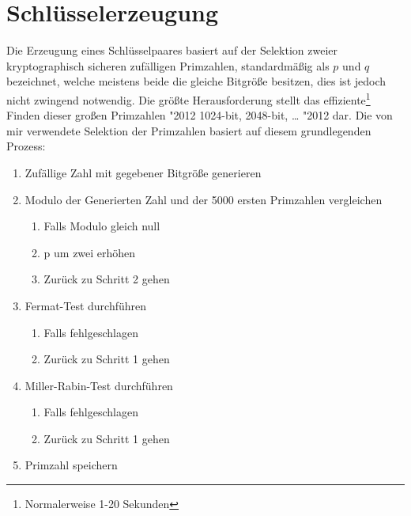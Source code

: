 \section{Schlüsselerzeugung}

Die Erzeugung eines Schlüsselpaares basiert auf der Selektion zweier kryptographisch sicheren zufälligen Primzahlen, standardmäßig als $p$ und $q$ bezeichnet, welche meistens beide die gleiche Bitgröße besitzen, dies ist jedoch nicht zwingend notwendig. Die größte Herausforderung stellt das effiziente\footnote{Normalerweise 1-20 Sekunden} Finden dieser großen Primzahlen \char"2012{} 1024-bit, 2048-bit, \ldots{} \char"2012{} dar. Die von mir verwendete Selektion der Primzahlen basiert auf diesem grundlegenden Prozess:

\begin{enumerate}
  \item Zufällige Zahl mit gegebener Bitgröße generieren
  \item Modulo der Generierten Zahl und der 5000 ersten Primzahlen vergleichen
    \begin{enumerate}
      \item Falls Modulo gleich null
      \item p um zwei erhöhen
      \item Zurück zu Schritt 2 gehen
    \end{enumerate}
  \item Fermat-Test durchführen
    \begin{enumerate}
      \item Falls fehlgeschlagen
      \item Zurück zu Schritt 1 gehen
    \end{enumerate}
  \item Miller-Rabin-Test durchführen
    \begin{enumerate}
      \item Falls fehlgeschlagen
      \item Zurück zu Schritt 1 gehen
    \end{enumerate}
  \item Primzahl speichern
\end{enumerate}

